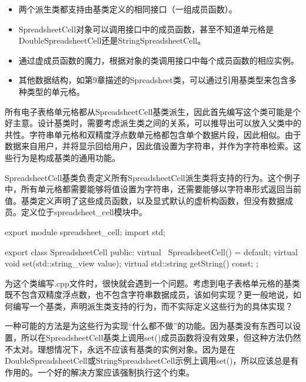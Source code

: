 \begin{itemize}
\item
两个派生类都支持由基类定义的相同接口（一组成员函数）。

\item
SpreadsheetCell对象可以调用接口中的成员函数，甚至不知道单元格是DoubleSpreadsheetCell还是StringSpreadsheetCell。

\item
通过虚成员函数的魔力，根据对象的类调用接口中每个成员函数的相应实例。

\item
其他数据结构，如第9章描述的Spreadsheet类，可以通过引用基类型来包含多种类型的单元格。
\end{itemize}


所有电子表格单元格都从SpreadsheetCell基类派生，因此首先编写这个类可能是个好主意。设计基类时，需要考虑派生类之间的关系，可以推导出可以放入父类中的共性。字符串单元格和双精度浮点数单元格都包含单个数据片段，因此相似。由于数据来自用户，并将显示回给用户，因此值设置为字符串，并作为字符串检索。这些行为是构成基类的通用功能。


SpreadsheetCell基类负责定义所有SpreadsheetCell派生类将支持的行为。这个例子中，所有单元格都需要能够将值设置为字符串，还需要能够以字符串形式返回当前值。基类定义声明了这些成员函数，以及显式默认的虚析构函数，但没有数据成员。定义位于spreadsheet\_cell模块中。

\begin{cpp}
export module spreadsheet_cell;
import std;

export class SpreadsheetCell
{
    public:
        virtual ~SpreadsheetCell() = default;
        virtual void set(std::string_view value);
        virtual std::string getString() const;
};
\end{cpp}

为这个类编写.cpp文件时，很快就会遇到一个问题。考虑到电子表格单元格的基类既不包含双精度浮点数，也不包含字符串数据成员，该如何实现？更一般地说，如何编写一个基类，声明派生类支持的行为，而不实际定义这些行为的具体实现？

一种可能的方法是为这些行为实现“什么都不做”的功能。因为基类没有东西可以设置，所以在SpreadsheetCell基类上调用set()成员函数将没有效果，但这种方法仍然不太对。理想情况下，永远不应该有基类的实例对象。因为是在DoubleSpreadsheetCell或StringSpreadsheetCell示例上调用set()，所以应该总是有作用的。一个好的解决方案应该强制执行这个约束。

